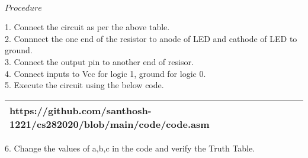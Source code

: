 \documentclass[journal,12pt,twocolumn]{IEEEtran}
\begin{document}
    \paragraph{$Procedure$}
    
    1. Connect the circuit as per the above table.\\
    2. Connnect the one end of the resistor to anode of LED and cathode of LED to ground.\\
    3. Connect the output pin to another end of resisor.\\
    4. Connect inputs to Vcc for logic 1, ground for logic 0.\\
    5. Execute the circuit using the below code.\\
   
\begin{tabularx}{0.46\textwidth} { 
  | >{\centering\arraybackslash}X |}
  \hline
  https://github.com/santhosh-1221/cs282020/blob/main/code/code.asm \\
  \hline
\end{tabularx}
   
6. Change the values of a,b,c in the code and verify the Truth Table.\\

\end{document}
